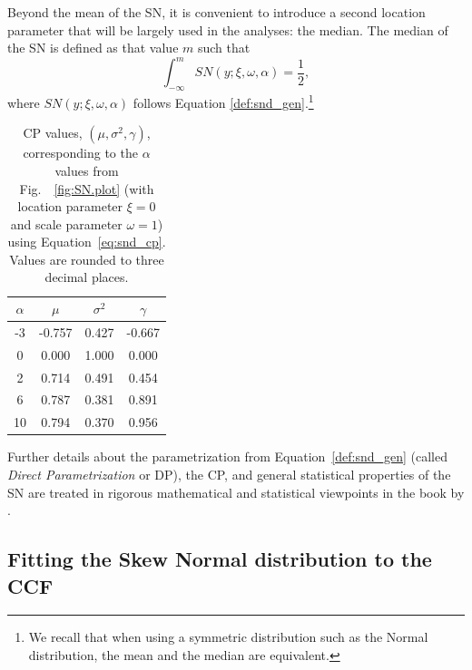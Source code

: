 \documentclass[11pt, oneside]{article}
\begin{document}
Beyond the mean of the SN, it is convenient to introduce a second location parameter that will be largely used in the analyses: the median. The median of the SN is defined as that value $m$ such that 
%
\begin{equation} \label{eq:snmed}
\int_{-\infty}^{m} SN(y;\xi, \omega, \alpha) = \frac{1}{2},
\end{equation}
%
where $SN(y;\xi, \omega, \alpha)$ follows Equation \ref{def:snd_gen}.\footnote{We recall that when using a symmetric distribution such as the Normal distribution, the mean and the median are equivalent.}

\begin{table}[htbp]
   \centering
   \begin{tabular}{|cccc|} %
\hline
$\alpha$ & $\mu$ & $\sigma^2$ & $\gamma$ \\
\hline
 -3 	&	 -0.757	&	 0.427	&	 -0.667 \\
0	&	 0.000 	&	1.000	&	 0.000 \\
2	&	 0.714	&	 0.491	&	 0.454\\
6	&	 0.787	&	 0.381	&	 0.891\\
10	&	 0.794	&	 0.370	&	 0.956\\
\hline
   \end{tabular}
   \caption{CP values, $(\mu, \sigma^2, \gamma)$, corresponding to the $\alpha$ values from Fig.~~\ref{fig:SN.plot} (with location parameter $\xi = 0$ and scale parameter $\omega = 1$) using Equation~\eqref{eq:snd_cp}.  Values are rounded to three decimal places.}
   \label{tab:cp_values}
\end{table}
%
Further details about the parametrization from Equation~\eqref{def:snd_gen} (called \emph{Direct Parametrization} or DP), the CP, and general statistical properties of the SN are treated in rigorous mathematical and statistical viewpoints in the book by \cite{Azzalini2014}.

\subsection{Fitting the Skew Normal distribution to the CCF} \label{sec:3}
\end{document}
